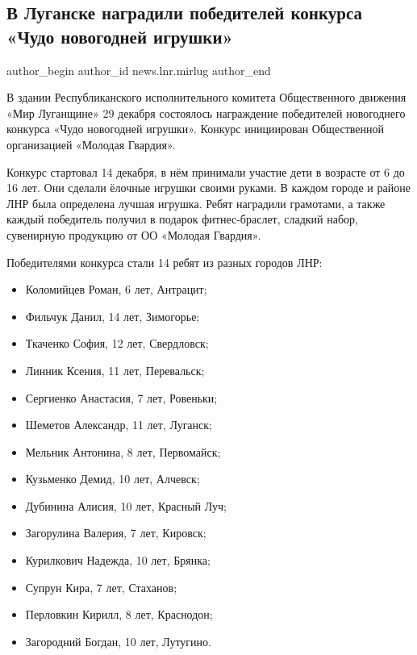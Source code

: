  
 
 
 
 
\subsection{В Луганске наградили победителей конкурса «Чудо новогодней игрушки»}
\label{sec:29_12_2021.stz.news.lnr.mirlug.1.konkurs_chudo_novogodnej_igrushki}

\ifcmt
 author_begin
   author_id news.lnr.mirlug
 author_end
\fi

В здании Республиканского исполнительного комитета Общественного движения «Мир
Луганщине» 29 декабря состоялось награждение победителей новогоднего конкурса
«Чудо новогодней игрушки». Конкурс инициирован Общественной организацией
«Молодая Гвардия».


Конкурс стартовал 14 декабря, в нём принимали участие дети в возрасте от 6 до
16 лет. Они сделали ёлочные игрушки своими руками. В каждом городе и районе ЛНР
была определена лучшая игрушка. Ребят наградили грамотами, а также каждый
победитель получил в подарок фитнес-браслет, сладкий набор, сувенирную
продукцию от ОО «Молодая Гвардия».

Победителями конкурса стали 14 ребят из разных городов ЛНР:

\begin{itemize} %
\item Коломийцев Роман, 6 лет, Антрацит;
\item Фильчук Данил, 14 лет, Зимогорье;
\item Ткаченко София, 12 лет, Свердловск;
\item Линник Ксения, 11 лет, Перевальск;
\item Сергиенко Анастасия, 7 лет, Ровеньки;
\item Шеметов Александр, 11 лет, Луганск;
\item Мельник Антонина, 8 лет, Первомайск;
\item Кузьменко Демид, 10 лет, Алчевск;
\item Дубинина Алисия, 10 лет, Красный Луч;
\item Загорулина Валерия, 7 лет, Кировск;
\item Курилкович Надежда, 10 лет, Брянка;
\item Супрун Кира, 7 лет, Стаханов;
\item Перловкин Кирилл, 8 лет, Краснодон;
\item Загородний Богдан, 10 лет, Лутугино.
\end{itemize} %

